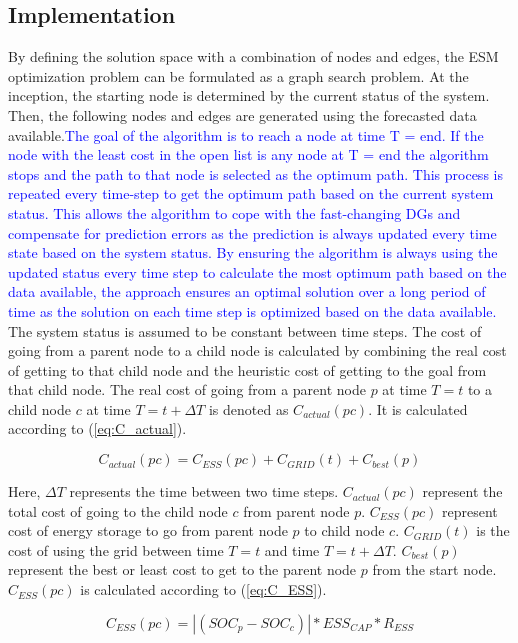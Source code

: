 \subsection{Implementation}
By defining the solution space with a combination of nodes and edges, the ESM optimization problem can be formulated as a graph search problem. At the inception, the starting node is determined by the current status of the system. Then, the following nodes and edges are generated using the forecasted data available.\textcolor{blue}{The goal of the algorithm is to reach a node at time T = end. If the node with the least cost in the open list is any node at T = end the algorithm stops and the path to that node is selected as the optimum path. This process is repeated every time-step to get the optimum path based on the current system status. This allows the algorithm to cope with the fast-changing DGs and compensate for prediction errors as the prediction is always updated every time state based on the system status. By ensuring the algorithm is always using the updated status every time step to calculate the most optimum path based on the data available, the approach ensures an optimal solution over a long period of time as the solution on each time step is optimized based on the data available.} The system status is assumed to be constant between time steps. The cost of going from a parent node to a child node is calculated by combining the real cost of getting to that child node and the heuristic cost of getting to the goal from that child node. The real cost of going from a parent node $p$ at time $T=t$ to a child node $c$ at time $T=t+\Delta T$ is denoted as $C_{actual}(pc)$. It is calculated according to (\ref{eq:C_actual}).

\begin{equation}
\label{eq:C_actual}
    C_{actual}(pc) =  C_{ESS}(pc)+C_{GRID}(t)+C_{best}(p)
\end{equation}

Here, $\Delta T$ represents the time between two time steps. $C_{actual}(pc)$ represent the total cost of going to the child node $c$ from parent node $p$. $C_{ESS}(pc)$ represent cost of energy storage to go from parent node $p$ to child node $c$. $C_{GRID}(t)$ is the cost of using the grid between time $T=t$ and time $T=t+\Delta T$. $C_{best}(p)$ represent the best or least cost to get to the parent node $p$ from the start node. $C_{ESS}(pc)$ is calculated according to (\ref{eq:C_ESS}).

\begin{equation}
\label{eq:C_ESS}
C_{ESS}(pc) = |(SOC_p - SOC_c)|*ESS_{CAP}*R_{ESS} 
\end{equation}


